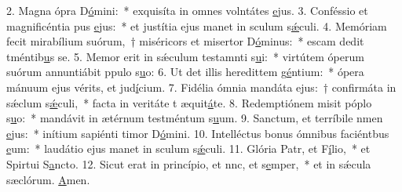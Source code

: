 2. Magna ópra D\uline{ó}mini:~* exquisíta in omnes volntátes \uline{e}jus.
3. Conféssio et magnificéntia pus \uline{e}jus:~* et justítia ejus manet in sculum s\uline{ǽ}culi.
4. Memóriam fecit mirabílium suórum,~† miséricors et misertor D\uline{ó}minus:~* escam dedit tméntib\uline{u}s se.
5. Memor erit in sǽculum testamnti s\uline{u}i:~* virtútem óperum suórum annuntiábit ppulo s\uline{u}o:
6. Ut det illis heredittem g\uline{é}ntium:~* ópera mánuum ejus vérits, et jud\uline{í}cium.
7. Fidélia ómnia mandáta ejus:~† confirmáta in sǽclum s\uline{ǽ}culi,~* facta in veritáte t æquit\uline{á}te.
8. Redemptiónem misit póplo s\uline{u}o:~* mandávit in ætérnum testméntum s\uline{u}um.
9. Sanctum, et terríbile nmen \uline{e}jus:~* inítium sapiénti timor D\uline{ó}mini.
10. Intelléctus bonus ómnibus faciéntbus \uline{e}um:~* laudátio ejus manet in sculum s\uline{ǽ}culi.
11. Glória Patr, et F\uline{í}lio,~* et Spirtui S\uline{a}ncto.
12. Sicut erat in princípio, et nnc, et s\uline{e}mper,~* et in sǽcula sæclórum. \uline{A}men.
